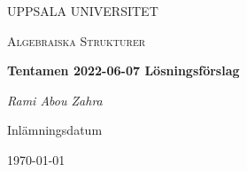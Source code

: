 \begin{titlepage}

  \centering
	{\scshape\LARGE UPPSALA UNIVERSITET\par}
	\vspace{1cm}
  {\scshape\Large {Algebraiska Strukturer} \par}
	\vspace{1.5cm}
  {\huge\bfseries {Tentamen 2022-06-07 Lösningsförslag} \par}
	\vspace{2cm}
	{\Large\itshape Rami Abou Zahra \par}
	\vfill
  \vfill


  {\large Inlämningsdatum}\par
  {\today}

\end{titlepage}

